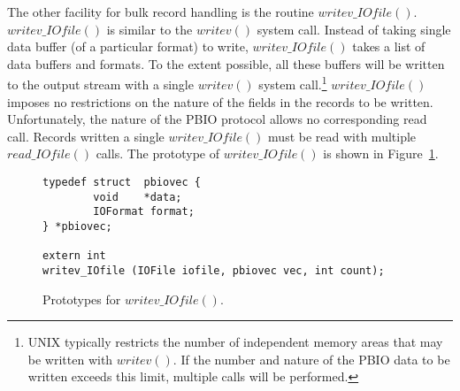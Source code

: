 \documentclass{article}
\begin{document}
The other facility for bulk record handling is the routine $writev\_IOfile()$.
$writev\_IOfile()$ is similar to the $writev()$ system call.  Instead of taking
single data buffer (of a particular format) to write, $writev\_IOfile()$ takes
a list of data buffers and formats.  To the extent possible, all these buffers
will be written to the output stream with a single $writev()$ system
call.\footnote{UNIX typically restricts the number of independent memory areas
that may be written with $writev()$.  If the number and nature of the PBIO
data to be written exceeds this limit, multiple calls will be performed.}
$writev\_IOfile()$ imposes no restrictions on the nature of the fields in the
records to be written.  Unfortunately, the nature of the PBIO protocol allows
no corresponding read call.  Records written a single $writev\_IOfile()$ must
be read with multiple $read\_IOfile()$ calls.  The prototype of
$writev\_IOfile()$ is shown in Figure~\ref{fig:writev}.
\begin{figure}[bth]
\begin{verbatim}
typedef struct  pbiovec {
        void    *data;
        IOFormat format;
} *pbiovec;

extern int
writev_IOfile (IOFile iofile, pbiovec vec, int count);
\end{verbatim}
\caption{Prototypes for $writev\_IOfile()$.\label{fig:writev}}
\end{figure}
\end{document}
